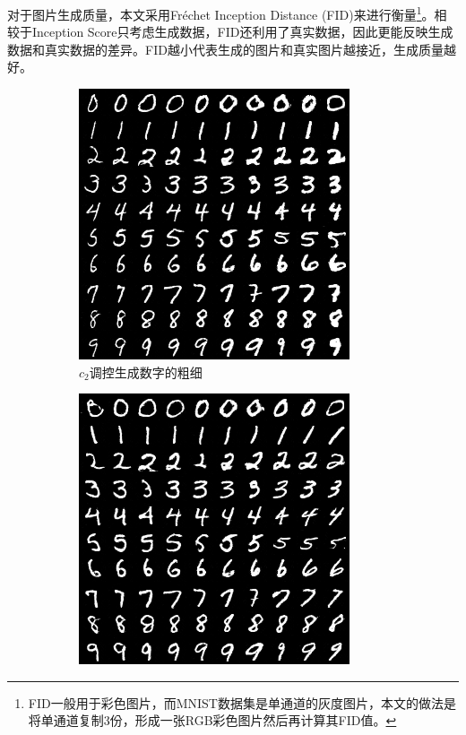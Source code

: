 对于图片生成质量，本文采用Fréchet Inception Distance (FID)\citep{heusel2017gans}来进行衡量\footnote{FID一般用于彩色图片，而MNIST数据集是单通道的灰度图片，本文的做法是将单通道复制3份，形成一张RGB彩色图片然后再计算其FID值。}。相较于Inception Score\citep{salimans2016improved}只考虑生成数据，FID还利用了真实数据，因此更能反映生成数据和真实数据的差异。FID越小代表生成的图片和真实图片越接近，生成质量越好。

\begin{figure}[htb]
  \centering
  \begin{subfigure}[b]{\trif\textwidth}
    \includegraphics[width=\textwidth]{Img/icg-width.png}
    \caption{$c_2$调控生成数字的粗细}
    \label{ffig:m-icg-witdth}
  \end{subfigure} 
  \begin{subfigure}[b]{\trif\textwidth}
    \includegraphics[width=\textwidth]{Img/icg-rotation.png}

\end{subfigure}
\end{figure}
